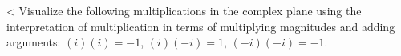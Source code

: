 <%
Visualize the following multiplications in the complex plane using the interpretation of multiplication
in terms of multiplying magnitudes and adding arguments: $(i)(i)=-1$, $(i)(-i)=1$, $(-i)(-i)=-1$.

